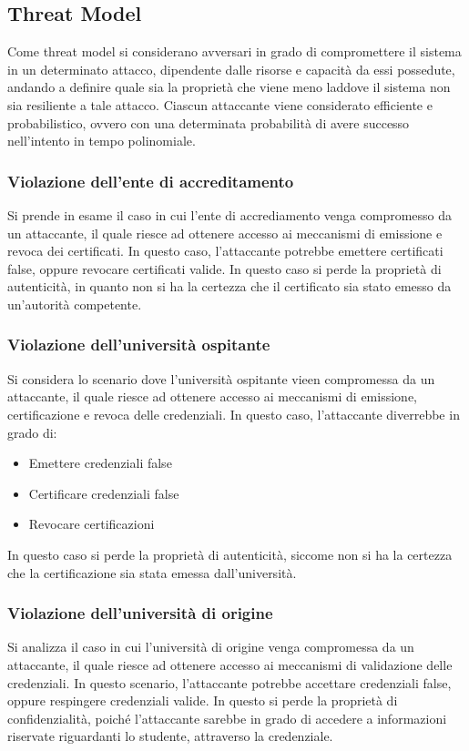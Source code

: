 \documentclass[a4paper,12pt]{article}
\begin{document}
\subsection{Threat Model}
Come threat model si considerano avversari in grado di compromettere il sistema in un determinato attacco, dipendente dalle risorse e capacità da essi possedute, andando a definire quale sia la proprietà che viene meno laddove il sistema non sia resiliente a tale attacco.
\newline Ciascun attaccante viene considerato efficiente e probabilistico, ovvero con una determinata probabilità di avere successo nell'intento in tempo polinomiale.
\subsubsection{Violazione dell'ente di accreditamento}
Si prende in esame il caso in cui l'ente di accrediamento venga compromesso da un attaccante, il quale riesce ad ottenere accesso ai meccanismi di emissione e revoca dei certificati. In questo caso, l'attaccante potrebbe emettere certificati false, oppure revocare certificati valide.
\newline In questo caso si perde la proprietà di autenticità, in quanto non si ha la certezza che il certificato sia stato emesso da un'autorità competente.
\subsubsection{Violazione dell'università ospitante}
Si considera lo scenario dove l'università ospitante vieen compromessa da un attaccante, il quale riesce ad ottenere accesso ai meccanismi di emissione, certificazione e revoca delle credenziali. In questo caso, l'attaccante diverrebbe in grado di:
\begin{itemize}
    \item Emettere credenziali false
    \item Certificare credenziali false
    \item Revocare certificazioni
\end{itemize}
In questo caso si perde la proprietà di autenticità, siccome non si ha la certezza che la certificazione sia stata emessa dall'università.
\subsubsection{Violazione dell'università di origine}
Si analizza il caso in cui l'università di origine venga compromessa da un attaccante, il quale riesce ad ottenere accesso ai meccanismi di validazione delle credenziali. In questo scenario, l'attaccante potrebbe accettare credenziali false, oppure respingere credenziali valide.
\newline In questo si perde la proprietà di confidenzialità, poiché l'attaccante sarebbe in grado di accedere a informazioni riservate riguardanti lo studente, attraverso la credenziale.
\end{document}
